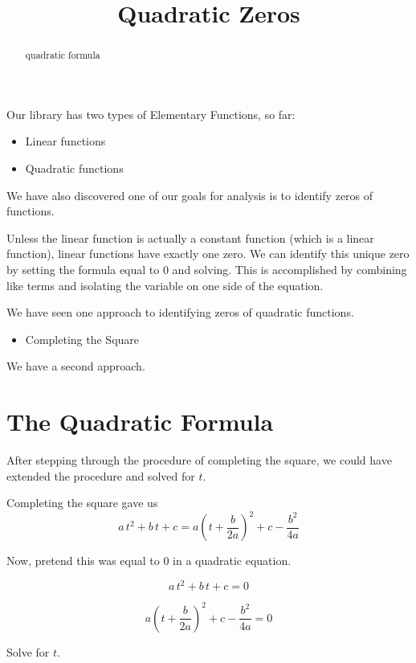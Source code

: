 \documentclass{ximera}
\title{Quadratic Zeros}
\begin{document}
\begin{abstract}
quadratic formula
\end{abstract}
\maketitle





Our library has two types of Elementary Functions, so far:

\begin{itemize}
\item Linear functions
\item Quadratic functions
\end{itemize}

We have also discovered one of our goals for analysis is to identify zeros of functions. 

Unless the linear function is actually a constant function (which is a linear function), linear functions have exactly one zero. We can identify this unique zero by setting the formula equal to $0$ and solving.  This is accomplished by combining like terms and isolating the variable on one side of the equation.

We have seen one approach to identifying zeros of quadratic functions.
\begin{itemize}
\item Completing the Square
\end{itemize}

We have a second approach. 




\section*{The Quadratic Formula}


After stepping through the procedure of completing the square, we could have extended the procedure and solved for $t$.


Completing the square gave us 
\[ a \, t^2 + b \, t + c = a \left(t + \frac{b}{2 a} \right)^2 + c - \frac{b^2}{4 a} \]


Now, pretend this was equal to $0$ in a quadratic equation.


\[ a \, t^2 + b \, t + c = 0 \]

\[ a\left(t + \frac{b}{2 a}\right)^2 + c - \frac{b^2}{4 a}  = 0\]

Solve for $t$.
\end{document}
